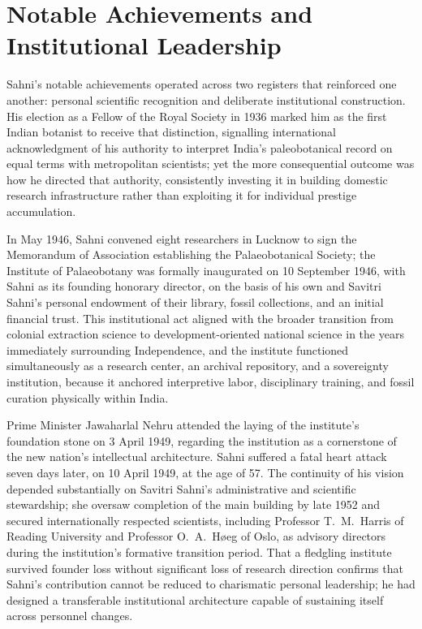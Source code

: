 \documentclass[10pt]{article}
\begin{document}
\section*{Notable Achievements and Institutional Leadership}

Sahni's notable achievements operated across two registers that reinforced one another: personal scientific recognition and deliberate institutional construction. His election as a Fellow of the Royal Society in 1936 marked him as the first Indian botanist to receive that distinction,\cite{wiki_birbal} signalling international acknowledgment of his authority to interpret India's paleobotanical record on equal terms with metropolitan scientists; yet the more consequential outcome was how he directed that authority, consistently investing it in building domestic research infrastructure rather than exploiting it for individual prestige accumulation.

In May 1946, Sahni convened eight researchers in Lucknow to sign the Memorandum of Association establishing the Palaeobotanical Society; the Institute of Palaeobotany was formally inaugurated on 10 September 1946, with Sahni as its founding honorary director, on the basis of his own and Savitri Sahni's personal endowment of their library, fossil collections, and an initial financial trust.\cite{bsip_history} This institutional act aligned with the broader transition from colonial extraction science to development-oriented national science in the years immediately surrounding Independence, and the institute functioned simultaneously as a research center, an archival repository, and a sovereignty institution, because it anchored interpretive labor, disciplinary training, and fossil curation physically within India.\cite{bsip_wiki}

Prime Minister Jawaharlal Nehru attended the laying of the institute's foundation stone on 3 April 1949, regarding the institution as a cornerstone of the new nation's intellectual architecture.\cite{bsip_history} Sahni suffered a fatal heart attack seven days later, on 10 April 1949, at the age of 57.\cite{wiki_birbal} The continuity of his vision depended substantially on Savitri Sahni's administrative and scientific stewardship; she oversaw completion of the main building by late 1952 and secured internationally respected scientists, including Professor T.~M.~Harris of Reading University and Professor O.~A.~H\o eg of Oslo, as advisory directors during the institution's formative transition period.\cite{from_lahore_lucknow} That a fledgling institute survived founder loss without significant loss of research direction confirms that Sahni's contribution cannot be reduced to charismatic personal leadership; he had designed a transferable institutional architecture capable of sustaining itself across personnel changes.
\end{document}
